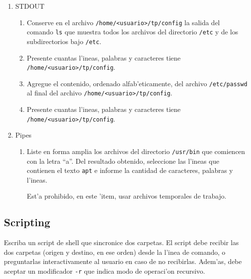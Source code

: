 \begin{enumerate}

\item STDOUT

\begin{enumerate}

\item Conserve en el archivo \texttt{/home/<usuario>/tp/config} la salida del comando \texttt{ls} que muestra todos los
archivos del directorio \texttt{/etc} y de los subdirectorios bajo \texttt{/etc}.

\item Presente cuantas l'ineas, palabras y caracteres tiene \texttt{/home/<usuario>/tp/config}.

\item Agregue el contenido, ordenado alfab'eticamente, del archivo \texttt{/etc/passwd} al final del
archivo \texttt{/home/<usuario>/tp/config}.

\item Presente cuantas l'ineas, palabras y caracteres tiene \texttt{/home/<usuario>/tp/config}.

\end{enumerate}

\item Pipes

\begin{enumerate}

\item Liste en forma amplia los archivos del directorio \texttt{/usr/bin} que comiencen con la letra ``a''.
Del resultado obtenido, seleccione las l'ineas que contienen el texto \texttt{apt} e informe la cantidad de caracteres,
palabras y l'ineas.

Est'a prohibido, en este 'item, usar archivos temporales de trabajo.

\end{enumerate}

\end{enumerate}

\subsection{Scripting}

Escriba un script de shell que sincronice dos carpetas. El script debe recibir las dos carpetas (origen y destino, en ese
orden) desde la l'inea de comando, o preguntarlas interactivamente al usuario en caso de no recibirlas. Adem'as, debe
aceptar un modificador \texttt{-r} que indica modo de operaci'on recursivo.

